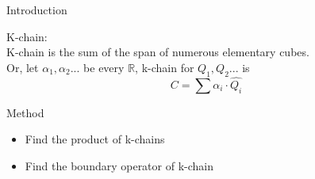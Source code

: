 \documentclass[aspectratio=169,xcolor=dvipsnames]{beamer}
\begin{document}
\begin{frame}{Introduction}
    \begin{definition}
        K-chain:  \\
        K-chain is the sum of the span of numerous elementary cubes. \\
        Or, 
        let $\alpha_1, \alpha_2 ...$ be every $\mathbb{R}$, k-chain for $Q_1, Q_2 ...$ is \\
        $$C = \sum \alpha_i \cdot \widehat{Q_i}$$
        
    \end{definition}

\end{frame}
\begin{frame}{Method}
    \begin{itemize}
        \item Find the product of k-chains  \\[10pt]

        \item Find the boundary operator of k-chain
    \end{itemize}
\end{frame}

\end{document}
